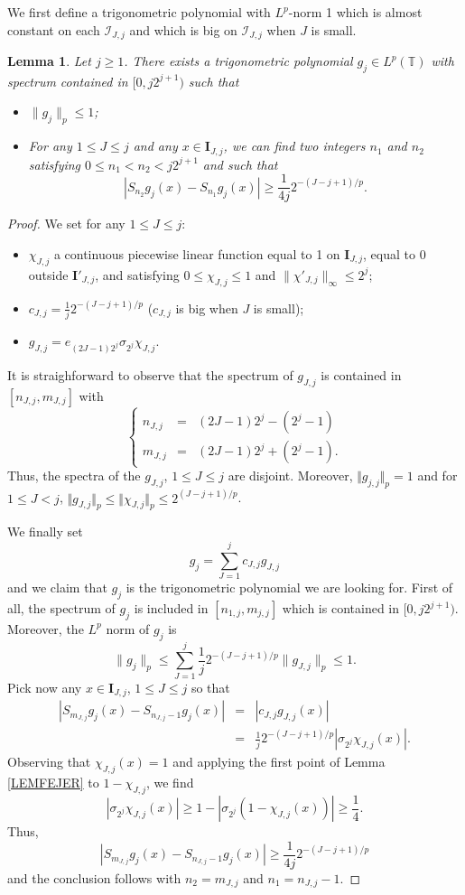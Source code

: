 \documentclass[11pt,a4paper]{amsart}
\theoremstyle{plain}
\newtheorem{lemma}[theorem]{Lemma}
\begin{document}
We first define a trigonometric polynomial with $L^p$-norm 1 which is almost constant on each
$\mathcal I_{J,j}$ and which is big on $\mathcal I_{J,j}$ when $J$ is small. 
\begin{lemma}\label{LEMBASICLP}
Let $j\geq 1$. There exists a trigonometric polynomial $g_j\in L^p({\mathbb T})$ with spectrum contained in
$[0,j2^{j+1})$ such that
\begin{itemize}
 \item $\|g_j\|_p\leq 1$;
 \item For any $1\leq J\leq j$ and any $x\in \mathbf I_{J,j}$, we can find two
   integers $n_1$ and $n_2$ satisfying 
   $0\le n_1<n_2< j2^{j+1}$ and such that
 $$|S_{n_2}g_j(x)-S_{n_1}g_j(x)|\geq\frac{1}{4j}2^{-(J-j+1)/p}.$$
\end{itemize}
\end{lemma}
\begin{proof}
We set for any $1\leq J\leq j$:
\begin{itemize}
\item $\chi_{J,j}$ a continuous piecewise linear function equal to 1 on $\mathbf I_{J,j}$, equal to 0 outside $\mathbf I'_{J,j}$, and satisfying
$0\leq \chi_{J,j}\leq 1$ and $\|\chi'_{J,j}\|_\infty\le 2^{j}$;
\item $c_{J,j}=\frac{1}{j}2^{-(J-j+1)/p}$ ($c_{J,j}$ is big when $J$ is small);
\item $g_{J,j}=e_{(2J-1)2^{j}}\sigma_{2^j}\chi_{J,j}$.
\end{itemize}
It is straighforward to observe that the spectrum of $g_{J,j}$ is contained in $[n_{J,j},m_{J,j}]$ with
$$\left\{\begin{array}{rcl}
n_{J,j}&=&(2J-1)2^{j}-(2^j-1)\\
m_{J,j}&=&(2J-1)2^{j}+(2^j-1).
\end{array}\right.$$
Thus, the spectra of the $g_{J,j}$, $1\leq J\leq j$ are
disjoint. Moreover, $\Vert g_{j,j}\Vert_p=1$ and for $1\le J<j$,  $\Vert
g_{J,j}\Vert_p\le\Vert\chi_{J,j}\Vert_p\le 2^{(J-j+1)/p}$.

We finally set
$$g_j=\sum_{J=1}^j c_{J,j}g_{J,j}$$
and we claim that $g_j$ is the trigonometric polynomial we are looking
for. First of all, the spectrum of $g_j$ is included in
$[n_{1,j},m_{j,j}]$ which is contained in $[0,j2^{j+1})$. Moreover, the $L^p$
norm of $g_j$ is
$$\|g_j\|_p\leq\sum_{J=1}^j \frac{1}{j}2^{-(J-j+1)/p}\|g_{J,j}\|_p\leq  1.$$
Pick now any $x\in \mathbf I_{J,j}$, $1\leq J\leq j$ so that
\begin{eqnarray*}
|S_{m_{J,j}}g_j(x)-S_{n_{J,j}-1}g_j(x)|&=&|c_{J,j}g_{J,j}(x)|\\
&=&\frac{1}j 2^{-(J-j+1)/p} |\sigma_{2^j}\chi_{J,j}(x)|.
\end{eqnarray*}
Observing that $\chi_{J,j}(x)=1$ and applying the first point of Lemma
\ref{LEMFEJER} to $1-\chi_{J,j}$, we find
$$\left|\sigma_{2^j}\chi_{J,j}(x)\right|\geq1-\left|\sigma_{2^j}(1-\chi_{J,j}(x))\right|\geq \frac14.$$
Thus,
$$|S_{m_{J,j}}g_j(x)-S_{n_{J,j}-1}g_j(x)|\geq \frac{1}{4j}2^{-(J-j+1)/p}$$
and the conclusion follows with $n_2=m_{J,j}$ and $n_1=n_{J,j}-1$.

\end{proof}
\end{document}
